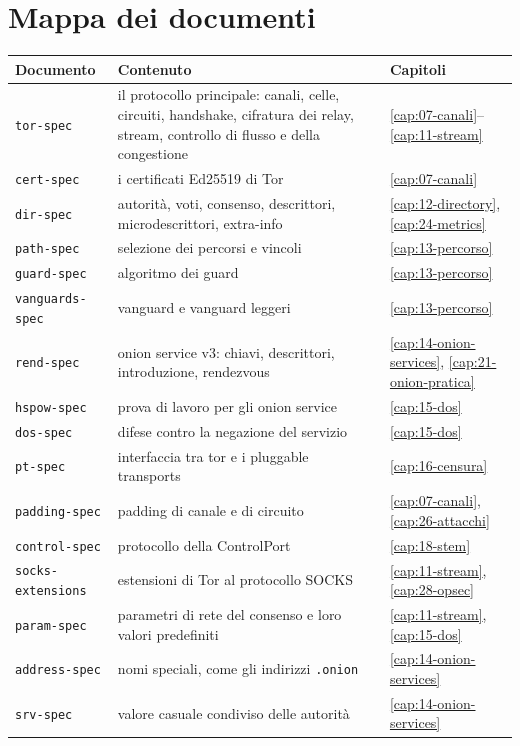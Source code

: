 \section{Mappa dei documenti}\label{sec:C-mappa}

\begin{center}\small
\begin{tabularx}{\textwidth}{@{}l>{\raggedright\arraybackslash}Xl@{}}
\toprule
Documento & Contenuto & Capitoli \\
\midrule
\texttt{tor-spec} & il protocollo principale: canali, celle, circuiti, handshake, cifratura dei relay, stream, controllo di flusso e della congestione & \ref{cap:07-canali}--\ref{cap:11-stream} \\
\texttt{cert-spec} & i certificati Ed25519 di Tor & \ref{cap:07-canali} \\
\texttt{dir-spec} & autorità, voti, consenso, descrittori, microdescrittori, extra-info & \ref{cap:12-directory}, \ref{cap:24-metrics} \\
\texttt{path-spec} & selezione dei percorsi e vincoli & \ref{cap:13-percorso} \\
\texttt{guard-spec} & algoritmo dei guard & \ref{cap:13-percorso} \\
\texttt{vanguards-spec} & vanguard e vanguard leggeri & \ref{cap:13-percorso} \\
\texttt{rend-spec} & onion service v3: chiavi, descrittori, introduzione, rendezvous & \ref{cap:14-onion-services}, \ref{cap:21-onion-pratica} \\
\texttt{hspow-spec} & prova di lavoro per gli onion service & \ref{cap:15-dos} \\
\texttt{dos-spec} & difese contro la negazione del servizio & \ref{cap:15-dos} \\
\texttt{pt-spec} & interfaccia tra tor e i pluggable transports & \ref{cap:16-censura} \\
\texttt{padding-spec} & padding di canale e di circuito & \ref{cap:07-canali}, \ref{cap:26-attacchi} \\
\texttt{control-spec} & protocollo della ControlPort & \ref{cap:18-stem} \\
\texttt{socks-extensions} & estensioni di Tor al protocollo SOCKS & \ref{cap:11-stream}, \ref{cap:28-opsec} \\
\texttt{param-spec} & parametri di rete del consenso e loro valori predefiniti & \ref{cap:11-stream}, \ref{cap:15-dos} \\
\texttt{address-spec} & nomi speciali, come gli indirizzi \texttt{.onion} & \ref{cap:14-onion-services} \\
\texttt{srv-spec} & valore casuale condiviso delle autorità & \ref{cap:14-onion-services} \\
\bottomrule
\end{tabularx}
\end{center}

